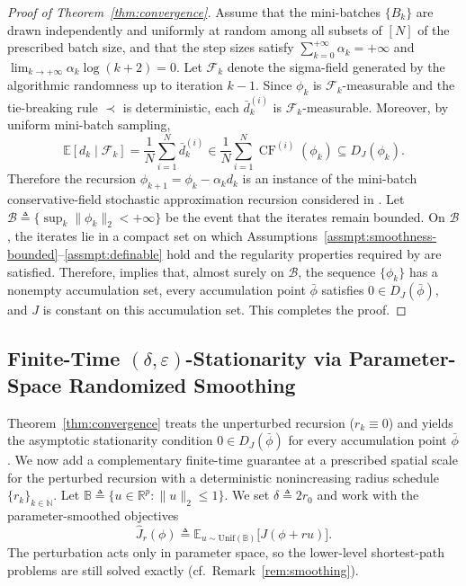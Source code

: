 \documentclass[11pt, letterpaper, oneside, reqno]{amsart}
\newcommand{\R}{\mathbb{R}}
\newcommand{\Let}{\triangleq}
\begin{document}
\begin{proof}[Proof of Theorem~\ref{thm:convergence}]
Assume that the mini-batches $\{B_k\}$ are drawn independently and uniformly at random among all subsets of $[N]$ of the prescribed batch size, and that the step sizes satisfy
$\sum_{k=0}^{+\infty}\alpha_k = +\infty$ and $\lim_{k\to+\infty}\alpha_k\log(k+2)=0$.
Let $\mathcal F_k$ denote the sigma-field generated by the algorithmic randomness up to iteration $k-1$. Since $\phi_k$ is $\mathcal F_k$-measurable and the tie-breaking rule $\prec$ is deterministic, each $\bar d_k^{(i)}$ is $\mathcal F_k$-measurable. Moreover, by uniform mini-batch sampling,
\[
\mathbb E[d_k\mid \mathcal F_k]
= \frac{1}{N}\sum_{i=1}^N \bar d_k^{(i)}
\in \frac{1}{N}\sum_{i=1}^N \operatorname{CF}^{(i)}(\phi_k)
\subseteq D_J(\phi_k).
\]
Therefore the recursion $\phi_{k+1}=\phi_k-\alpha_k d_k$ is an instance of the mini-batch conservative-field stochastic approximation recursion considered in \cite[Theorem~9]{ref:bolte2021conservative}.
Let $\mathcal B\Let\{\sup_k \|\phi_k\|_2< +\infty\}$ be the event that the iterates remain bounded.
On $\mathcal B$, the iterates lie in a compact set on which Assumptions~\ref{assmpt:smoothness-bounded}--\ref{assmpt:definable} hold and the regularity properties
required by \cite[Theorem~9]{ref:bolte2021conservative} are satisfied.
Therefore, \cite[Theorem~9]{ref:bolte2021conservative} implies that, almost surely on $\mathcal B$, the sequence $\{\phi_k\}$ has a nonempty accumulation set, every accumulation point $\bar\phi$ satisfies $0\in D_J(\bar\phi)$,
and $J$ is constant on this accumulation set.
This completes the proof.
\end{proof}


\subsection{Finite-Time $(\delta,\varepsilon)$-Stationarity via Parameter-Space Randomized Smoothing}
\label{ec:finite-time-proof}

Theorem~\ref{thm:convergence} treats the unperturbed recursion ($r_k\equiv 0$) and yields the asymptotic stationarity condition $0\in D_J(\bar\phi)$ for every accumulation point $\bar\phi$. We now add a complementary finite-time guarantee at a prescribed spatial scale for the perturbed recursion with a deterministic nonincreasing radius schedule $\{r_k\}_{k\in\mathbb N}$. Let 
$\mathbb{B} \Let \{u\in\R^p: \|u\|_2 \leq 1\}$.
We set $\delta \Let 2r_0$ and work with the parameter-smoothed objectives
\begin{equation}
\hat J_r(\phi) \Let \mathbb{E}_{u\sim \mathrm{Unif}(\mathbb{B})}\big[J(\phi+r u)\big].
\label{eq:Jhat}
\end{equation}
The perturbation acts only in parameter space, so the lower-level shortest-path problems are still solved exactly (cf.\ Remark~\ref{rem:smoothing}).
\end{document}
